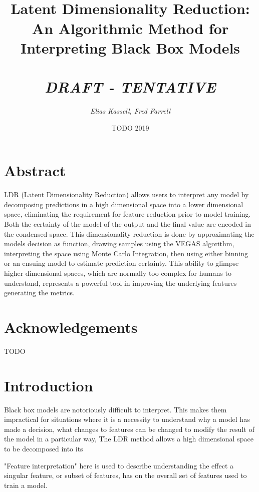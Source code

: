 \documentclass[a4paperpaper,twocolumn]{article}
\begin{document}
\title{\huge \\Latent Dimensionality Reduction: An Algorithmic Method for Interpreting Black Box Models\\~\\
\Large \emph{DRAFT - TENTATIVE}}
\author{\emph{Elias Kassell, Fred Farrell}}
\date{TODO 2019}
\maketitle

\section{Abstract}\label{abstract}

LDR (Latent Dimensionality Reduction) allows users to interpret any model by decomposing predictions in a high dimensional space into a lower dimensional space, eliminating the requirement for feature reduction prior to model training. Both the certainty of the model of the output and the final value are encoded in the condensed space. This dimensionality reduction is done by approximating the models decision as function, drawing samples using the VEGAS algorithm, interpreting the space using Monte Carlo Integration, then using either binning or an ensuing model to estimate prediction certainty. This ability to glimpse higher dimensional spaces, which are normally too complex for humans to understand, represents a powerful tool in improving the underlying features generating the metrics.

\section*{Acknowledgements}

TODO

\section{Introduction}\label{Introduction}

Black box models are notoriously difficult to interpret. This makes them impractical for situations where it is a necessity to understand why a model has made a decision, what changes to features can be changed to modify the result of the model in a particular way,  The LDR method allows a high dimensional space to be decomposed into its 

"Feature interpretation" here is used to describe understanding the effect a singular feature, or subset of features, has on the overall set of features used to train a model.
\end{document}
